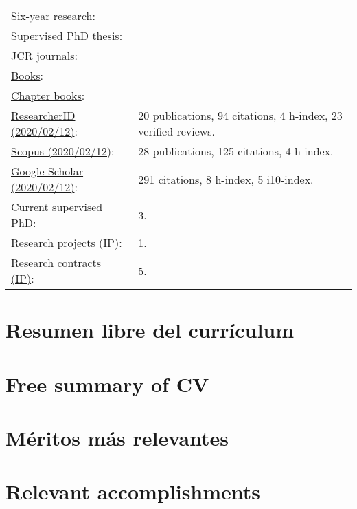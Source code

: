 \documentclass[a4paper]{article}
\def\english{1}
\begin{document}
\begin{tabular}{ll}
Six-year research: &  \\
\href{https://vicente-gonzalez-ruiz.github.io/ridiculum/#x1-180009}{Supervised PhD thesis}: &  \\
\href{https://vicente-gonzalez-ruiz.github.io/ridiculum/#x1-20001}{JCR journals}: &  \\
\href{https://vicente-gonzalez-ruiz.github.io/ridiculum/#x1-60003}{Books}: &  \\
\href{https://vicente-gonzalez-ruiz.github.io/ridiculum/#x1-80004}{Chapter books}: &  \\
\href{http://www.researcherid.com/rid/\ResearcherID}{ResearcherID (2020/02/12)}: & 20 publications, 94 citations, 4 h-index, 23 verified reviews. \\
\href{https://www.scopus.com/cto2/main.uri?ctoId=CTODS_1179301116&authors=7004348637&authors=36647469700&origin=AuthorNamesList}{Scopus (2020/02/12)}: & 28 publications, 125 citations, 4 h-index. \\
\href{https://scholar.google.es/citations?hl=es&user=\GoogleUser}{Google Scholar (2020/02/12)}: & 291 citations, 8 h-index, 5 i10-index. \\
Current supervised PhD: & 3.\\
\href{https://vicente-gonzalez-ruiz.github.io/ridiculum/#x1-100005}{Research projects (IP)}: & 1. \\
\href{https://vicente-gonzalez-ruiz.github.io/ridiculum/#x1-160008}{Research contracts (IP)}: & 5.
\end{tabular}
\fi

\ifx\english\undefined
\section{Resumen libre del currículum}
\else
\section{Free summary of CV}
\fi


\ifx\english\undefined
\section{Méritos más relevantes}
\else
\section{Relevant accomplishments}
\fi
\end{document}
